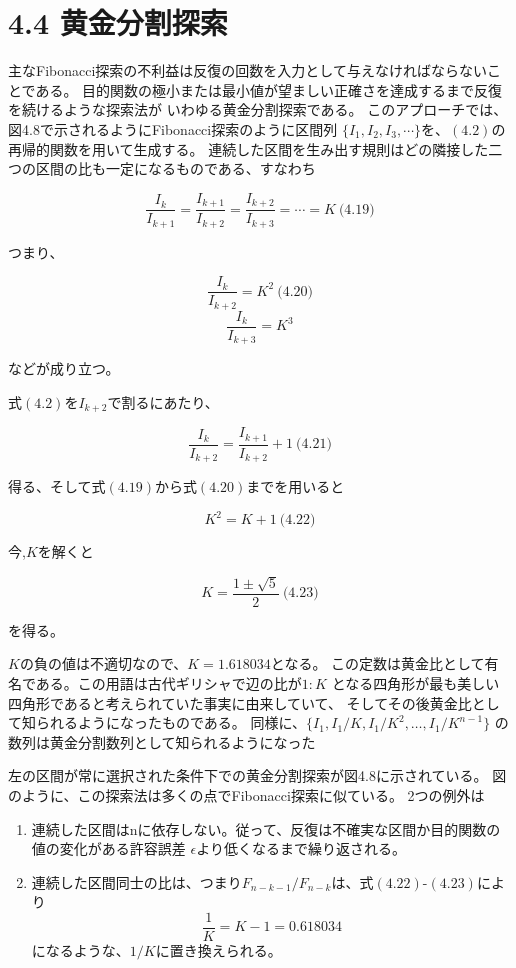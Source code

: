 \section*{4.4 黄金分割探索}\label{4-4-}

主なFibonacci探索の不利益は反復の回数を入力として与えなければならないことである。
目的関数の極小または最小値が望ましい正確さを達成するまで反復を続けるような探索法が
いわゆる黄金分割探索である。
このアプローチでは、図4.8で示されるようにFibonacci探索のように区間列
$\lbrace I_1, I_2, I_3 ,
\cdots \rbrace$を、$(4.2)$の再帰的関数を用いて生成する。
連続した区間を生み出す規則はどの隣接した二つの区間の比も一定になるものである、すなわち

$$\frac{I_k}{I_{k+1}} =
\frac{I_{k+1}}{I_{k+2}} =
\frac{I_{k+2}}{I_{k+3}} = \cdots
= K \ \text{(4.19)}$$

つまり、

$$ \frac{I_k}{I_{k+2}} = K^2
\ \text{(4.20)} $$
$$
\frac{I_k}{I_{k+3}} = K^3 $$

などが成り立つ。

式$(4.2)$を$I_{k+2}$で割るにあたり、

$$\frac{I_k}{I_{k+2}} =
\frac{I_{k+1}}{I_{k+2}} + 1 \
\text{(4.21)}$$

得る、そして式$(4.19)$から式$(4.20)$までを用いると

$$K^2 = K + 1 \ \text{(4.22)}$$

今,$K$を解くと

$$K = \frac{1 \pm
\sqrt{5}}{2} \
\text{(4.23)}$$

を得る。

$K$の負の値は不適切なので、$K = 1.618034$となる。
この定数は黄金比として有名である。この用語は古代ギリシャで辺の比が$1 :
K$
となる四角形が最も美しい四角形であると考えられていた事実に由来していて、
そしてその後黄金比として知られるようになったものである。
同様に、$\lbrace I_1, I_1/K , I_1 / K^2 ,
\dots , I_1 / K^{n-1} \rbrace$
の数列は黄金分割数列として知られるようになった
\newpage

左の区間が常に選択された条件下での黄金分割探索が図4.8に示されている。
図のように、この探索法は多くの点でFibonacci探索に似ている。 2つの例外は

\begin{enumerate}
\tightlist
\item
  連続した区間はnに依存しない。従って、反復は不確実な区間か目的関数の値の変化がある許容誤差
  $\epsilon$より低くなるまで繰り返される。
\item
  連続した区間同士の比は、つまり$F_{n-k-1} /
  F_{n-k}$は、式$(4.22)$-$(4.23)$により
  $$\frac{1}{K} = K - 1 = 0.618034$$
  になるような、$1/K$に置き換えられる。
\end{enumerate}

